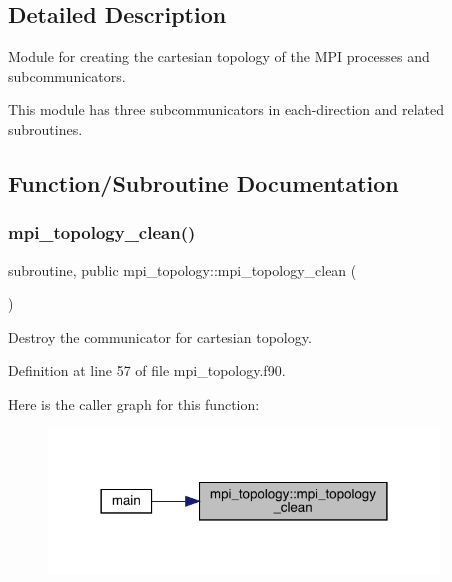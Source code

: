 \subsection{Detailed Description}
Module for creating the cartesian topology of the M\+PI processes and subcommunicators. 

This module has three subcommunicators in each-\/direction and related subroutines. 

\subsection{Function/\+Subroutine Documentation}
\mbox{\label{namespacempi__topology_aa14e91baaec6d1c1082ebd5ac6e19128}} 
\subsubsection{\texorpdfstring{mpi\_topology\_clean()}{mpi\_topology\_clean()}}
{\footnotesize\ttfamily subroutine, public mpi\+\_\+topology\+::mpi\+\_\+topology\+\_\+clean (\begin{DoxyParamCaption}{ }\end{DoxyParamCaption})}



Destroy the communicator for cartesian topology. 



Definition at line 57 of file mpi\+\_\+topology.\+f90.

Here is the caller graph for this function\+:
\nopagebreak
\begin{figure}[H]
\begin{center}
\leavevmode
\includegraphics[width=294pt]{namespacempi__topology_aa14e91baaec6d1c1082ebd5ac6e19128_icgraph}
\end{center}
\end{figure}
\mbox{\label{namespacempi__topology_a8819f16f50aded913f17520a29d3ec4c}} 
